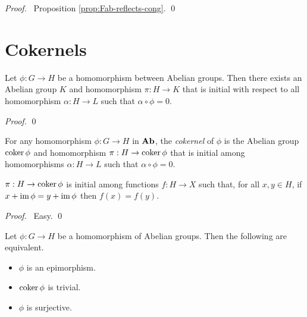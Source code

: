 \begin{proof}
\pf\ Proposition \ref{prop:Fab-reflects-cong}. \qed
\end{proof}

\section{Cokernels}

\begin{prop}
Let $\phi : G \rightarrow H$ be a homomorphism between Abelian groups. Then there exists an Abelian group $K$ and homomorphism $\pi : H \rightarrow K$ that is initial with respect to all homomorphism $\alpha : H \rightarrow L$ such that $\alpha \circ \phi = 0$.
\end{prop}

\begin{proof}
\pf
{}
\qed
\end{proof}

\begin{df}[Cokernel]
For any homomorphism $\phi : G \rightarrow H$ in $\mathbf{Ab}$, the \emph{cokernel} of $\phi$ is the Abelian group $\operatorname{coker} \phi$ and homomorphism $\pi : H \rightarrow \operatorname{coker} \phi$ that is initial among homomorphisms $\alpha : H \rightarrow L$ such that $\alpha \circ \phi = 0$.
\end{df}

\begin{prop}
$\pi : H \rightarrow \operatorname{coker} \phi$ is initial among functions $f : H \rightarrow X$ such that, for all $x,y \in H$, if $x + \operatorname{im} \phi = y + \operatorname{im} \phi$ then $f(x) = f(y)$.
\end{prop}

\begin{proof}
\pf\ Easy. \qed
\end{proof}

\begin{prop}
Let $\phi : G \rightarrow H$ be a homomorphism of Abelian groups. Then the following are equivalent.
\begin{itemize}
\item $\phi$ is an epimorphism.
\item $\operatorname{coker} \phi$ is trivial.
\item $\phi$ is surjective.
\end{itemize}
\end{prop}

